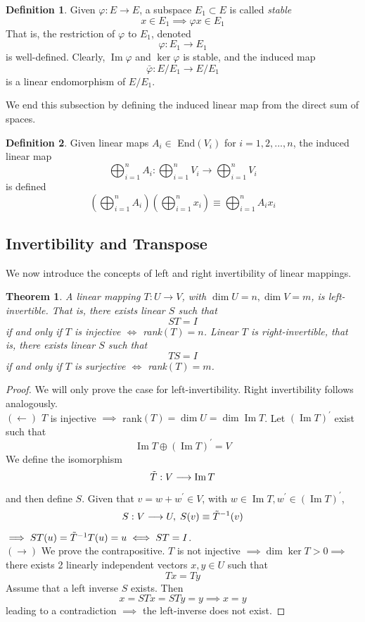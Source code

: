 \documentclass{article}
\DeclareMathOperator{\im}{Im}
\newtheorem{theorem}{Theorem}[section]
\theoremstyle{remark}
\theoremstyle{definition}
\newtheorem{definition}{Definition}[section]
\begin{document}
    \begin{definition}
    Given $\varphi: E \longrightarrow E$, a subspace $E_1 \subset E$ is called \textit{stable} 
    \[x \in E_1 \implies \varphi x \in E_1\]
    That is, the restriction of $\varphi$ to $E_1$, denoted
    \[\varphi: E_1 \longrightarrow E_1\]
    is well-defined. Clearly, $\im{\varphi}$ and $\ker{\varphi}$ is stable, and the induced map 
    \[\bar{\varphi}: E / E_1 \longrightarrow E / E_1\]
    is a linear endomorphism of $E / E_1$. 
    \end{definition}

    We end this subsection by defining the induced linear map from the direct sum of spaces. 
    \begin{definition}
    Given linear maps $A_i \in$ End$(V_i)$ for $i = 1, 2, ..., n$, the induced linear map
    \[\bigoplus_{i =1}^n A_i: \bigoplus_{i=1}^n V_i \longrightarrow \bigoplus_{i=1}^n V_i\]
    is defined
    \[(\bigoplus_{i=1}^n A_i)(\bigoplus_{i=1}^n x_i) \equiv \bigoplus_{i=1}^n A_i x_i\]
    \end{definition}

  \subsection{Invertibility and Transpose}

    We now introduce the concepts of left and right invertibility of linear mappings. 

    \begin{theorem}
    A linear mapping $T: U \longrightarrow V$, with $\dim{U} = n, \dim{V} = m$, is \textit{left-invertible}. That is, there exists linear $S$ such that 
    \[S T = I\]
    if and only if $T$ is injective $\iff$ rank$(T) = n$. Linear $T$ is \textit{right-invertible}, that is, there exists linear $S$ such that 
    \[T S = I\]
    if and only if $T$ is surjective $\iff$ rank$(T) = m$. 
    \end{theorem}
    \begin{proof}
    We will only prove the case for left-invertibility. Right invertibility follows analogously. \\
    $(\leftarrow)$ $T$ is injective $\implies$ rank$(T) = \dim{U} = \dim{\im{T}}$. Let $(\im{T})^\prime$ exist such that 
    \[\im{T} \oplus (\im{T})^\prime = V\]
    We define the isomorphism 
    \[\Tilde{T}: V \longrightarrow \im{T}\]
    and then define $S$. Given that $v = w + w^\prime \in V$, with $w \in \im{T}, w^\prime \in (\im{T})^\prime$, 
    \[S : V \longrightarrow U, \; S(v) \equiv \Tilde{T}^{-1} (v)\]
    $\implies S T (u) = \Tilde{T}^{-1} T (u) = u \iff S T = I$. \\
    $(\rightarrow)$ We prove the contrapositive. $T$ is not injective $\implies \dim{\ker{T}} > 0 \implies $ there exists 2 linearly independent vectors $x, y \in U$ such that
    \[T x = T y\]
    Assume that a left inverse $S$ exists. Then 
    \[x = S T x = S T y = y \implies x = y\]
    leading to a contradiction $\implies$ the left-inverse does not exist. 
    \end{proof}
\end{document}
